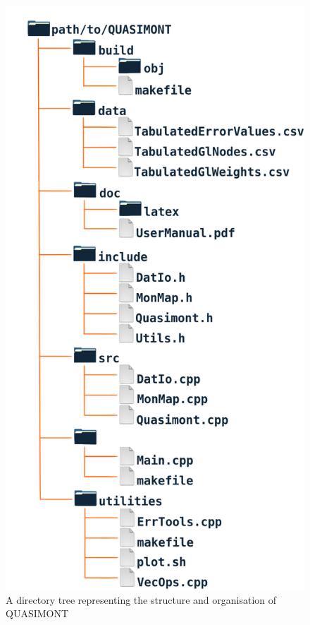 \documentclass[a4paper, twosided]{book}
\begin{document}
\newpage
\begin{center}
        \begin{figure}[H]
        \includegraphics[keepaspectratio, height=\textheight]{images/DirectoryStructure.png}
        \caption{A directory tree representing the structure and organisation of QUASIMONT}
        \label{Fig2.1}
        \end{figure}
\end{center}
\end{document}
